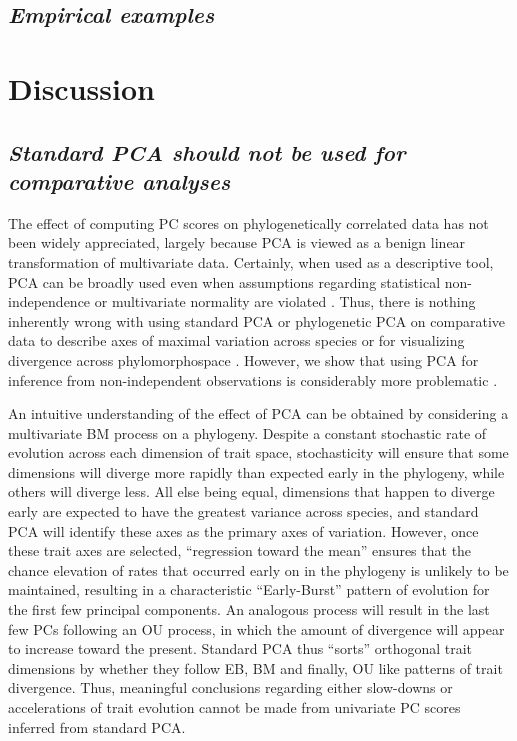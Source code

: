 \documentclass[a4paper,12pt]{article}
\begin{document}
\subsection{\emph{Empirical examples}}

\section{Discussion}
\subsection{\emph{Standard PCA should not be used for comparative analyses}} 

The effect of computing PC scores on phylogenetically correlated data has not been widely appreciated, largely because PCA is viewed as a benign linear transformation of multivariate data. Certainly, when used as a descriptive tool, PCA can be broadly used even when assumptions regarding statistical non-independence or multivariate normality are violated \citep{Jolliffe2002}. Thus, there is nothing inherently wrong with using standard PCA or phylogenetic PCA on comparative data to describe axes of maximal variation across species or for visualizing divergence across phylomorphospace \citep{Sidlauskas2008}. However, we show that using PCA for inference from non-independent observations is considerably more problematic \citep{Jolliffe2002}. 

An intuitive understanding of the effect of PCA can be obtained by considering a multivariate BM process on a phylogeny. Despite a constant stochastic rate of evolution across each dimension of trait space, stochasticity will ensure that some dimensions will diverge more rapidly than expected early in the phylogeny, while others will diverge less. All else being equal, dimensions that happen to diverge early are expected to have the greatest variance across species, and standard PCA will identify these axes as the primary axes of variation. However, once these trait axes are selected, ``regression toward the mean'' ensures that the chance elevation of rates that occurred early on in the phylogeny is unlikely to be maintained, resulting in a characteristic ``Early-Burst'' pattern of evolution for the first few principal components. An analogous process will result in the last few PCs following an OU process, in which the amount of divergence will appear to increase toward the present. Standard PCA thus ``sorts'' orthogonal trait dimensions by whether they follow EB, BM and finally, OU like patterns of trait divergence. Thus, meaningful conclusions regarding either slow-downs or accelerations of trait evolution cannot be made from univariate PC scores inferred from standard PCA. 
\end{document}

